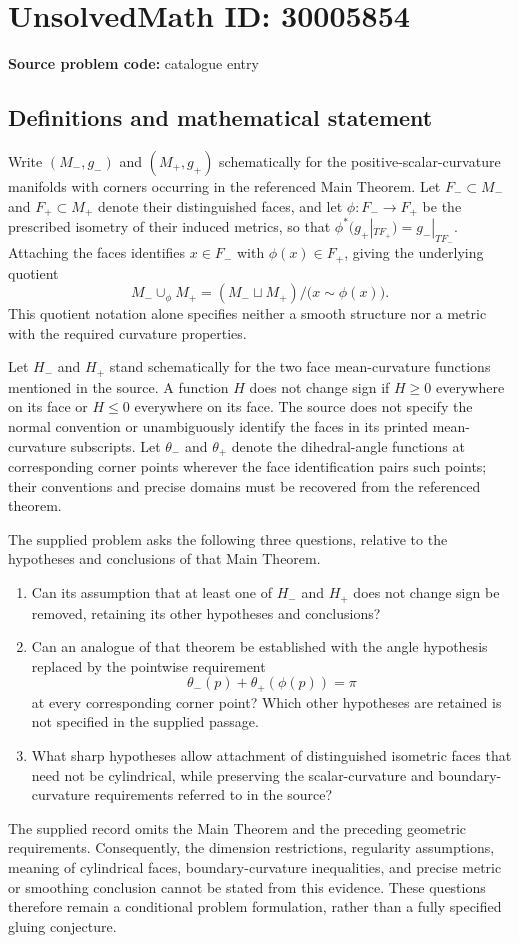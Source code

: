 \documentclass[11pt]{article}
\begin{document}
\section*{UnsolvedMath ID: 30005854}
\textbf{Source problem code:} catalogue entry
\subsection{Definitions and mathematical statement}
Write \((M_-,g_-)\) and \((M_+,g_+)\) schematically for the positive-scalar-curvature manifolds with corners occurring in the referenced Main Theorem. Let \(F_-\subset M_-\) and \(F_+\subset M_+\) denote their distinguished faces, and let \(\phi:F_-\to F_+\) be the prescribed isometry of their induced metrics, so that \(\phi^*(g_+|_{TF_+})=g_-|_{TF_-}\). Attaching the faces identifies \(x\in F_-\) with \(\phi(x)\in F_+\), giving the underlying quotient
\[
M_-\cup_\phi M_+=(M_-\sqcup M_+)/\bigl(x\sim\phi(x)\bigr).
\]
This quotient notation alone specifies neither a smooth structure nor a metric with the required curvature properties.

Let \(H_-\) and \(H_+\) stand schematically for the two face mean-curvature functions mentioned in the source. A function \(H\) does not change sign if \(H\geq0\) everywhere on its face or \(H\leq0\) everywhere on its face. The source does not specify the normal convention or unambiguously identify the faces in its printed mean-curvature subscripts. Let \(\theta_-\) and \(\theta_+\) denote the dihedral-angle functions at corresponding corner points wherever the face identification pairs such points; their conventions and precise domains must be recovered from the referenced theorem.

The supplied problem asks the following three questions, relative to the hypotheses and conclusions of that Main Theorem.
\begin{enumerate}
\item Can its assumption that at least one of \(H_-\) and \(H_+\) does not change sign be removed, retaining its other hypotheses and conclusions?
\item Can an analogue of that theorem be established with the angle hypothesis replaced by the pointwise requirement
\[
\theta_-(p)+\theta_+(\phi(p))=\pi
\]
at every corresponding corner point? Which other hypotheses are retained is not specified in the supplied passage.
\item What sharp hypotheses allow attachment of distinguished isometric faces that need not be cylindrical, while preserving the scalar-curvature and boundary-curvature requirements referred to in the source?
\end{enumerate}
The supplied record omits the Main Theorem and the preceding geometric requirements. Consequently, the dimension restrictions, regularity assumptions, meaning of cylindrical faces, boundary-curvature inequalities, and precise metric or smoothing conclusion cannot be stated from this evidence. These questions therefore remain a conditional problem formulation, rather than a fully specified gluing conjecture.
\end{document}

